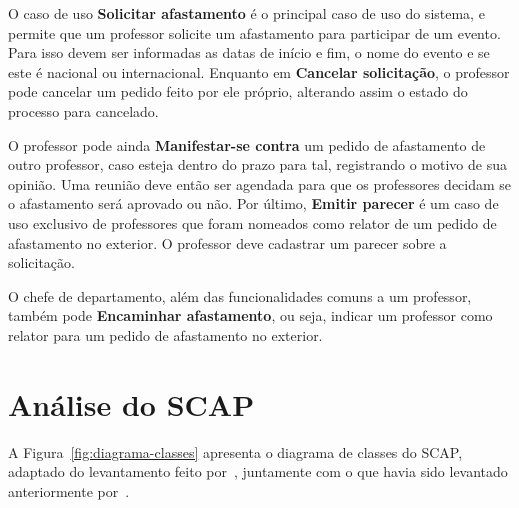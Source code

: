 O caso de uso \textbf{Solicitar afastamento} é o principal caso de uso do sistema, e permite
que um professor solicite um afastamento para participar de um evento. Para isso devem ser informadas
as datas de início e fim, o nome do evento e se este é nacional ou internacional. 
Enquanto em \textbf{Cancelar solicitação}, o professor pode cancelar um pedido feito por ele próprio,
alterando assim o estado do processo para cancelado.

O professor pode ainda \textbf{Manifestar-se contra} um pedido de afastamento de 
outro professor, caso esteja dentro do prazo para tal, registrando o motivo de sua opinião.
Uma reunião deve então ser agendada para que os professores decidam se o afastamento será aprovado ou não.
Por último, \textbf{Emitir parecer} é um caso de uso exclusivo de professores que foram nomeados
como relator de um pedido de afastamento no exterior. O professor deve cadastrar um parecer sobre a solicitação.

O chefe de departamento, além das funcionalidades comuns a um professor, também pode \textbf{Encaminhar afastamento},
ou seja, indicar um professor como relator para um pedido de afastamento no exterior. 


\section{Análise do SCAP}
\label{sec-espec-analise-scap}

A Figura~\ref{fig:diagrama-classes} apresenta o diagrama de classes do SCAP, adaptado
do levantamento feito por~, juntamente com o que havia sido
levantado anteriormente por~.


